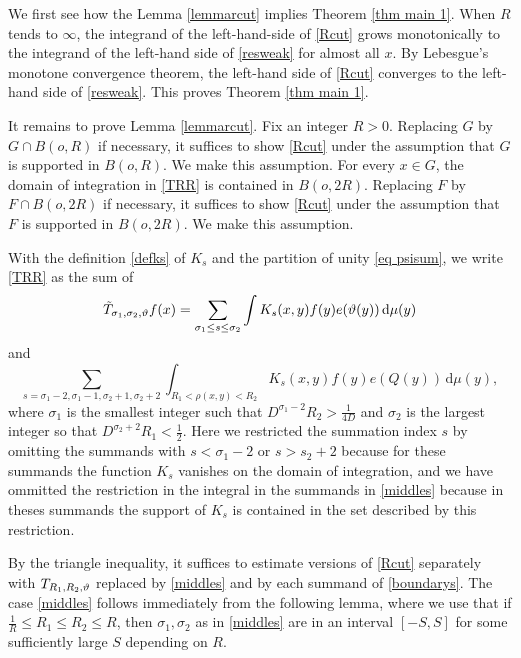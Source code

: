We first see how the Lemma \ref{lemmarcut} implies
Theorem \ref{thm main 1}. When $R$ tends to $\infty$, the integrand of the left-hand-side of \eqref{Rcut}
grows monotonically to the integrand of the
left-hand side of \eqref{resweak} for almost all $x$.
By Lebesgue's monotone convergence theorem, the left-hand side of \eqref{Rcut} converges to the
left-hand side of \eqref{resweak}. This proves Theorem \ref{thm main 1}.

It remains to prove Lemma \ref{lemmarcut}.
Fix an integer $R>0$.  Replacing
$G$ by $G\cap B(o,R)$ if necessary, it suffices to show
\eqref{Rcut} under the assumption that $G$ is supported in $B(o,R)$. We make this assumption.
For every $x\in G$, the domain of integration
in \eqref{TRR} is contained in $B(o,2R)$.
Replacing
$F$ by $F\cap B(o,2R)$ if necessary, it suffices to show
\eqref{Rcut} under the assumption that $F$ is supported in $B(o,2R)$. We make this assumption.

With the definition \eqref{defks} of $K_s$
and the partition of unity \eqref{eq psisum}, we write \eqref{TRR} as the sum of 
\begin{equation}\label{middles}
\Tilde{T}_{\sigma_1,\sigma_2,\vartheta}f(x)=\sum_{\sigma_1 \le s\le \sigma_2}
\int K_s(x,y)  f(y) e(\vartheta(y)) \, \mathrm{d}\mu(y)
\end{equation}
and
\begin{equation}\label{boundarys}
\sum_{s=\sigma_1-2,\sigma_1-1, \sigma_2+1,\sigma_2+2}
\int_{R_1 <  \rho(x,y) < R_2}  K_s(x,y) f(y) e(Q(y)) \,
    \mathrm{d}\mu(y),
\end{equation}
where $\sigma_1$ is the smallest integer such that $D^{\sigma_1-2}R_2>\frac 1{4D}$ and $\sigma_2$
is the largest integer so that $D^{\sigma_2+2}R_1<\frac 12$. Here we restricted the summation index $s$
by omitting the summands with $s<\sigma_1-2$
or $s>s_2+2$ because for these summands the function $K_s$ vanishes on the domain of integration, and we have ommitted the restriction in the integral
in the  summands in \eqref{middles} because in theses summands the support of $K_s$ is contained in
the set described by this restriction.



By the triangle inequality, it suffices to estimate
versions of \eqref{Rcut} separately with $T_{R_1,R_2,\vartheta}$ replaced by
\eqref{middles} and by each summand of \eqref{boundarys}.
The case \eqref{middles} follows immediately from the following lemma, where we use that if
$\frac 1R\le R_1\le R_2\le R$, then $\sigma_1,\sigma_2$
as in \eqref{middles} are in an interval $[-S,S]$ for some
sufficiently large $S$ depending on $R$.

